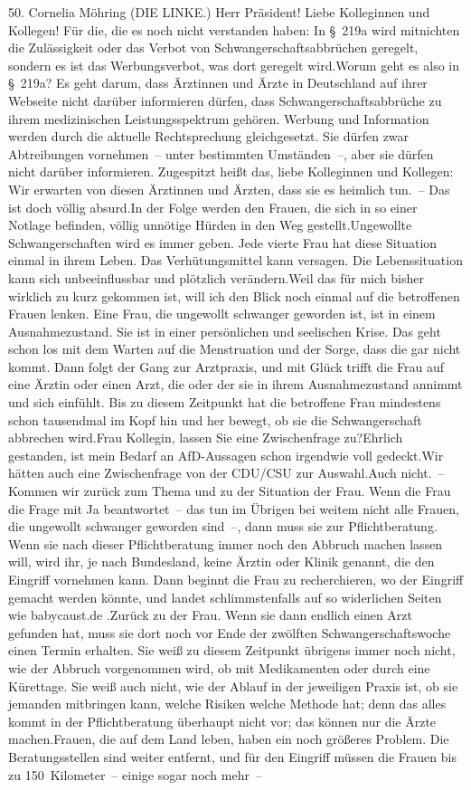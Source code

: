 \documentclass{article}
\begin{document}
	50. Cornelia Möhring (DIE LINKE.) Herr Präsident! Liebe Kolleginnen und Kollegen! Für die, die es noch nicht verstanden haben: In § 219a wird mitnichten die Zulässigkeit oder das Verbot von Schwangerschaftsabbrüchen geregelt, sondern es ist das Werbungsverbot, was dort geregelt wird.Worum geht es also in § 219a? Es geht darum, dass Ärztinnen und Ärzte in Deutschland auf ihrer Webseite nicht darüber informieren dürfen, dass Schwangerschaftsabbrüche zu ihrem medizinischen Leistungsspektrum gehören. Werbung und Information werden durch die aktuelle Rechtsprechung gleichgesetzt. Sie dürfen zwar Abtreibungen vornehmen – unter bestimmten Umständen –, aber sie dürfen nicht darüber informieren. Zugespitzt heißt das, liebe Kolleginnen und Kollegen: Wir erwarten von diesen Ärztinnen und Ärzten, dass sie es heimlich tun. – Das ist doch völlig absurd.In der Folge werden den Frauen, die sich in so einer Notlage befinden, völlig unnötige Hürden in den Weg gestellt.Ungewollte Schwangerschaften wird es immer geben. Jede vierte Frau hat diese Situation einmal in ihrem Leben. Das Verhütungsmittel kann versagen. Die Lebenssituation kann sich unbeeinflussbar und plötzlich verändern.Weil das für mich bisher wirklich zu kurz gekommen ist, will ich den Blick noch einmal auf die betroffenen Frauen lenken. Eine Frau, die ungewollt schwanger geworden ist, ist in einem Ausnahmezustand. Sie ist in einer persönlichen und seelischen Krise. Das geht schon los mit dem Warten auf die Menstruation und der Sorge, dass die gar nicht kommt. Dann folgt der Gang zur Arztpraxis, und mit Glück trifft die Frau auf eine Ärztin oder einen Arzt, die oder der sie in ihrem Ausnahmezustand annimmt und sich einfühlt. Bis zu diesem Zeitpunkt hat die betroffene Frau mindestens schon tausendmal im Kopf hin und her bewegt, ob sie die Schwangerschaft abbrechen wird.Frau Kollegin, lassen Sie eine Zwischenfrage zu?Ehrlich gestanden, ist mein Bedarf an AfD-Aussagen schon irgendwie voll gedeckt.Wir hätten auch eine Zwischenfrage von der CDU/CSU zur Auswahl.Auch nicht. – Kommen wir zurück zum Thema und zu der Situation der Frau. Wenn die Frau die Frage mit Ja beantwortet – das tun im Übrigen bei weitem nicht alle Frauen, die ungewollt schwanger geworden sind –, dann muss sie zur Pflichtberatung. Wenn sie nach dieser Pflichtberatung immer noch den Abbruch machen lassen will, wird ihr, je nach Bundesland, keine Ärztin oder Klinik genannt, die den Eingriff vornehmen kann. Dann beginnt die Frau zu recherchieren, wo der Eingriff gemacht werden könnte, und landet schlimmstenfalls auf so widerlichen Seiten wie babycaust.de .Zurück zu der Frau. Wenn sie dann endlich einen Arzt gefunden hat, muss sie dort noch vor Ende der zwölften Schwangerschaftswoche einen Termin erhalten. Sie weiß zu diesem Zeitpunkt übrigens immer noch nicht, wie der Abbruch vorgenommen wird, ob mit Medikamenten oder durch eine Kürettage. Sie weiß auch nicht, wie der Ablauf in der jeweiligen Praxis ist, ob sie jemanden mitbringen kann, welche Risiken welche Methode hat; denn das alles kommt in der Pflichtberatung überhaupt nicht vor; das können nur die Ärzte machen.Frauen, die auf dem Land leben, haben ein noch größeres Problem. Die Beratungsstellen sind weiter entfernt, und für den Eingriff müssen die Frauen bis zu 150 Kilometer – einige sogar noch mehr – 
\end{document}
